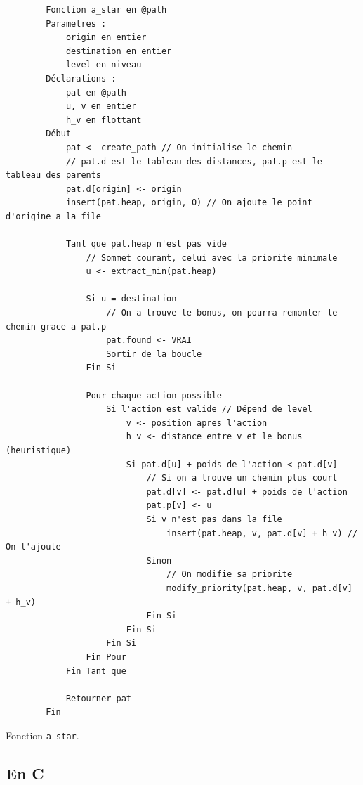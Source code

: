 \begin{longlisting}
    \begin{verbatim}
        Fonction a_star en @path
        Parametres :
            origin en entier
            destination en entier
            level en niveau
        Déclarations :
            pat en @path
            u, v en entier
            h_v en flottant
        Début
            pat <- create_path // On initialise le chemin
            // pat.d est le tableau des distances, pat.p est le tableau des parents
            pat.d[origin] <- origin
            insert(pat.heap, origin, 0) // On ajoute le point d'origine a la file

            Tant que pat.heap n'est pas vide
                // Sommet courant, celui avec la priorite minimale
                u <- extract_min(pat.heap)

                Si u = destination
                    // On a trouve le bonus, on pourra remonter le chemin grace a pat.p
                    pat.found <- VRAI
                    Sortir de la boucle
                Fin Si

                Pour chaque action possible
                    Si l'action est valide // Dépend de level
                        v <- position apres l'action
                        h_v <- distance entre v et le bonus (heuristique)
                        Si pat.d[u] + poids de l'action < pat.d[v]
                            // Si on a trouve un chemin plus court
                            pat.d[v] <- pat.d[u] + poids de l'action
                            pat.p[v] <- u
                            Si v n'est pas dans la file
                                insert(pat.heap, v, pat.d[v] + h_v) // On l'ajoute
                            Sinon
                                // On modifie sa priorite
                                modify_priority(pat.heap, v, pat.d[v] + h_v)
                            Fin Si
                        Fin Si
                    Fin Si
                Fin Pour
            Fin Tant que

            Retourner pat
        Fin
    \end{verbatim}
    \caption{Fonction \texttt{a\_star}.}
    \label{listing:c-a_star}
\end{longlisting}

\subsection{En C}

